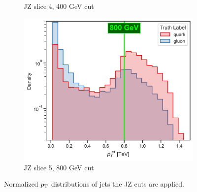 \begin{figure}[!htb]
\begin{subfigure}[t]{0.49\textwidth}
        \caption{JZ slice 4, 400 GeV cut}
        \label{fig:jz_separete_4}
    \end{subfigure}
    \begin{subfigure}[t]{0.49\textwidth}
        \centering
        \includegraphics[width=\linewidth]{src/plots/pt_jet_label_5.jpg}
        \caption{JZ slice 5, 800 GeV cut}
        \label{fig:jz_separete_5}
    \end{subfigure}
    \caption{Normalized $p_\text{T}$ distributions of jets  the JZ cuts are applied.}
    \label{fig:jz_separete}
\end{figure}

